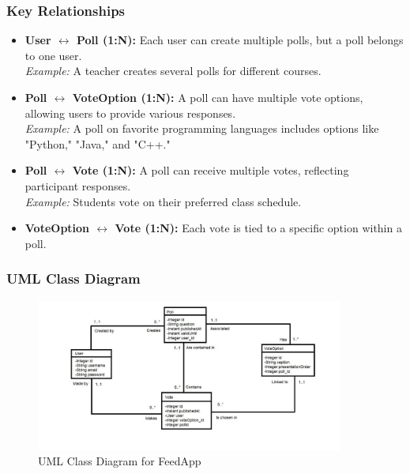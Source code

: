 \subsubsection{Key Relationships}

\begin{itemize}
    \item \textbf{User $\leftrightarrow$ Poll (1:N):} Each user can create multiple polls, but a poll belongs to one user.\\
    \textit{Example:} A teacher creates several polls for different courses.

    \item \textbf{Poll $\leftrightarrow$ VoteOption (1:N):} A poll can have multiple vote options, allowing users to provide various responses.\\
    \textit{Example:} A poll on favorite programming languages includes options like "Python," "Java," and "C++."

    \item \textbf{Poll $\leftrightarrow$ Vote (1:N):} A poll can receive multiple votes, reflecting participant responses.\\
    \textit{Example:} Students vote on their preferred class schedule.

    \item \textbf{VoteOption $\leftrightarrow$ Vote (1:N):} Each vote is tied to a specific option within a poll.
\end{itemize}

\subsubsection{UML Class Diagram}

\begin{figure}[h!]
    \centering
    \includegraphics[width=0.9\textwidth]{figs/uml_diagram.jpg} 
    \caption{UML Class Diagram for FeedApp}
    \label{fig:uml_class_diagram}
\end{figure}

